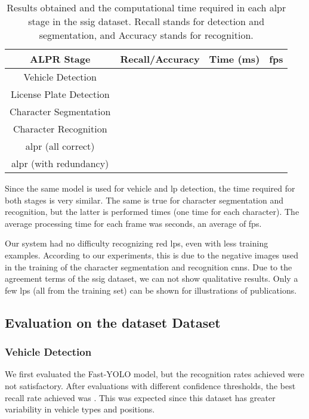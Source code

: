 \begin{table}[!htb]
	\centering
	\caption{Results obtained and the computational time required in each \gls*{alpr} stage in the \gls*{ssig} dataset. Recall stands for detection and segmentation, and Accuracy stands for recognition.}
	\label{tab:ssig_fps}
	\begin{tabular}{@{}cccc@{}}
		\toprule
		ALPR Stage & Recall/Accuracy & Time (ms) & \gls*{fps} \\ \midrule
		Vehicle Detection &  &  &  \\
		License Plate Detection &  &  &  \\
		Character Segmentation &  &  &  \\
		Character Recognition &  &    &  \\ \midrule
		\gls*{alpr} (all correct) &  & \multirow{2}{*}{} & \multirow{2}{*}{} \\
		\gls*{alpr} (with redundancy) &  & & \\ \bottomrule
	\end{tabular}
\end{table}

Since the same model is used for vehicle and \gls*{lp} detection, the time required for both stages is very similar. The same is true for character segmentation and recognition, but the latter is performed  times (one time for each character). The average processing time for each frame was  seconds, an average of  \gls*{fps}.

Our system had no difficulty recognizing red \glspl*{lp}, even with less training examples. According to our experiments, this is due to the negative images used in the training of the character segmentation and recognition \glspl*{cnn}. 
Due to the agreement terms of the \gls*{ssig} dataset, we can not show qualitative results. 
Only a few \glspl*{lp} (all from the training set) can be shown for illustrations of publications.

\subsection{Evaluation on the \acrshort*{dataset} Dataset}
\label{dataset:results_ssig}

\subsubsection{Vehicle Detection}

We first evaluated the Fast-YOLO model, but the recognition rates achieved were not satisfactory. After evaluations with different confidence thresholds, the best recall rate achieved was . This was expected since this dataset has greater variability in vehicle types and positions. 

